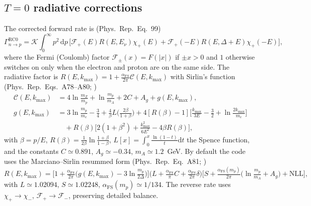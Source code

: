 \documentclass[11pt,a4paper]{article}
\newcommand{\dd}{\mathrm{d}}
\newcommand{\PR}{Phys.\ Rep.}
\newcommand{\Gap}{\Delta}
\newcommand{\Kw}{\mathcal{K}}
\newcommand{\afs}{\alpha_{\mathrm{FS}}}
\begin{document}
\subsection*{$T=0$ radiative corrections}
The corrected forward rate is (\PR\ Eq.~99)
\begin{equation}
  \Gamma^{\mathrm{RC}0}_{n\to p}=\Kw\!\int_0^\infty\! p^2\,\dd p\,
    \big[\mathcal F_+(E)R(E,E_\nu)\chi_+(E)
        +\mathcal F_+(-E)R(E,\Gap+E)\chi_+(-E)\big],
\end{equation}
where the Fermi (Coulomb) factor $\mathcal F_\pm(x)=F(|x|)$ if $\pm x>0$ and $1$
otherwise switches on only when the electron and proton are on the same side.
The radiative factor is $R(E,k_{\max})=1+\frac{\afs}{2\pi}\mathcal C(E,k_{\max})$
with Sirlin's function (\PR\ Eqs.~A78--A80; \cite{Sirlin1967})
\begin{align}
  \mathcal C(E,k_{\max}) &= 4\ln\frac{m_Z}{m_p}+\ln\frac{m_p}{m_A}+2C+A_g
     + g(E,k_{\max}),\\
  g(E,k_{\max}) &= 3\ln\frac{m_p}{m_e}-\frac34
     + \frac{4}{\beta}L\!\Big(\frac{2\beta}{1+\beta}\Big)
     + 4[R(\beta)-1]\!\Big[\frac{k_{\max}}{3E}-\frac32+\ln\frac{2k_{\max}}{m_e}\Big]
     \nonumber\\
     &\quad + R(\beta)\Big[2(1+\beta^2)+\frac{k_{\max}^2}{6E^2}-4\beta R(\beta)\Big],
\end{align}
with $\beta=p/E$, $R(\beta)=\tfrac{1}{2\beta}\ln\tfrac{1+\beta}{1-\beta}$,
$L[x]=\int_0^x\tfrac{\ln(1-t)}{t}\dd t$ the Spence function, and the constants
$C\simeq0.891$, $A_g\simeq-0.34$, $m_A\simeq1.2$~GeV. By default the code uses
the Marciano--Sirlin resummed form (\PR\ Eq.~A81; \cite{Czarnecki2004})
\begin{equation}
  R(E,k_{\max}) = \Big[1+\tfrac{\afs}{2\pi}\big(g(E,k_{\max})-3\ln\tfrac{m_p}{2\Gap}\big)\Big]
    \Big(L+\tfrac{\afs}{\pi}C+\tfrac{\afs}{2\pi}\delta\Big)
    \Big[S+\tfrac{\afs(m_p)}{2\pi}\big(\ln\tfrac{m_p}{m_A}+A_g\big)+\text{NLL}\Big],
\end{equation}
with $L\simeq1.02094$, $S\simeq1.02248$, $\afs(m_p)\simeq1/134$. The reverse rate
uses $\chi_+\to\chi_-$, $\mathcal F_+\to\mathcal F_-$, preserving detailed balance.
\end{document}
